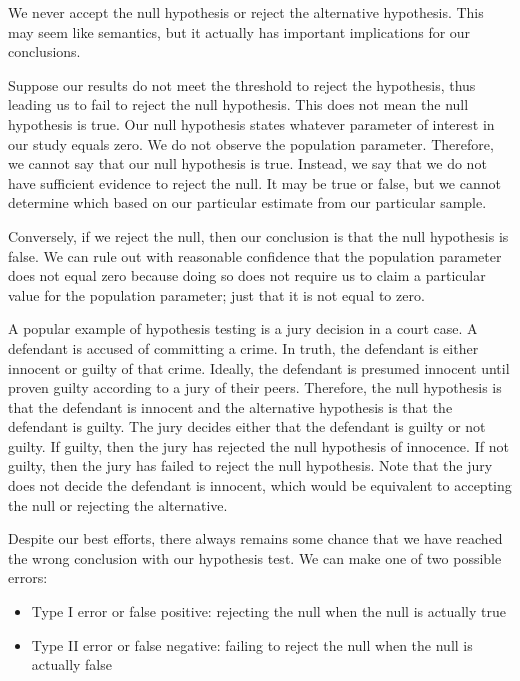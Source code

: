 \documentclass[
]{book}
\providecommand{\tightlist}{%
  \setlength{\itemsep}{0pt}\setlength{\parskip}{0pt}}
\begin{document}
We never accept the null hypothesis or reject the alternative hypothesis. This may seem like semantics, but it actually has important implications for our conclusions.

Suppose our results do not meet the threshold to reject the hypothesis, thus leading us to fail to reject the null hypothesis. This does not mean the null hypothesis is true. Our null hypothesis states whatever parameter of interest in our study equals zero. We do not observe the population parameter. Therefore, we cannot say that our null hypothesis is true. Instead, we say that we do not have sufficient evidence to reject the null. It may be true or false, but we cannot determine which based on our particular estimate from our particular sample.

Conversely, if we reject the null, then our conclusion is that the null hypothesis is false. We can rule out with reasonable confidence that the population parameter does not equal zero because doing so does not require us to claim a particular value for the population parameter; just that it is not equal to zero.

A popular example of hypothesis testing is a jury decision in a court case. A defendant is accused of committing a crime. In truth, the defendant is either innocent or guilty of that crime. Ideally, the defendant is presumed innocent until proven guilty according to a jury of their peers. Therefore, the null hypothesis is that the defendant is innocent and the alternative hypothesis is that the defendant is guilty. The jury decides either that the defendant is guilty or not guilty. If guilty, then the jury has rejected the null hypothesis of innocence. If not guilty, then the jury has failed to reject the null hypothesis. Note that the jury does not decide the defendant is innocent, which would be equivalent to accepting the null or rejecting the alternative.

Despite our best efforts, there always remains some chance that we have reached the wrong conclusion with our hypothesis test. We can make one of two possible errors:

\begin{itemize}
\tightlist
\item
  Type I error or false positive: rejecting the null when the null is actually true
\item
  Type II error or false negative: failing to reject the null when the null is actually false
\end{itemize}
\end{document}
